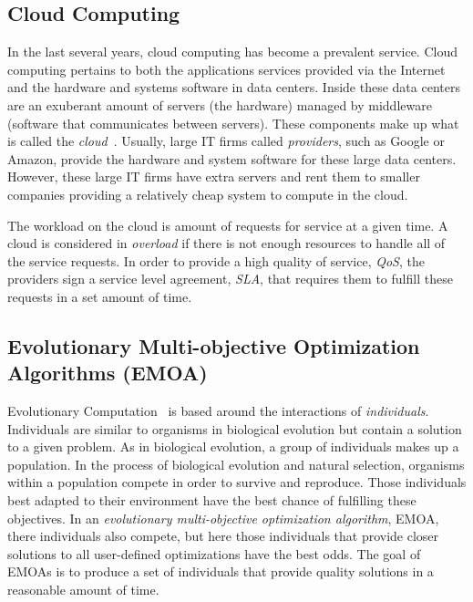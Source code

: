 \documentclass{sig-alternate}
\begin{document}
\subsection{Cloud Computing}
\label{sec:Cloud Computing}

In the last several years, cloud computing has become a prevalent service. Cloud computing pertains to both the applications services provided via the Internet and the hardware and systems software in data centers. Inside these data centers are an exuberant amount of servers (the hardware) managed by middleware (software that communicates between servers). These components make up what is called the \emph{cloud}~\cite{Armbrust}. Usually, large IT firms called \emph{providers}, such as Google or Amazon, provide the hardware and system software for these large data centers. However, these large IT firms have extra servers and rent them to smaller companies providing a relatively cheap system to compute in the cloud. 

The workload on the cloud is amount of requests for service at a given time. A cloud is considered in \emph{overload} if there is not enough resources to handle all of the service requests. In order to provide a high quality of service, \emph{QoS}, the providers sign a service level agreement, \emph{SLA}, that requires them to fulfill these requests in a set amount of time. 

\subsection{Evolutionary Multi-objective Optimization Algorithms (EMOA)}
\label{sec:EMOA}

Evolutionary Computation~\cite{poli08:fieldguide} is based around the interactions of \emph{individuals}. Individuals are similar to organisms in biological evolution but contain a solution to a given problem. As in biological evolution, a group of individuals makes up a population. In the process of biological evolution and natural selection, organisms within a population compete in order to survive and reproduce. Those individuals best adapted to their environment have the best chance of fulfilling these objectives.  In an \emph{evolutionary multi-objective optimization algorithm}, EMOA, there individuals also compete, but here those individuals that provide closer solutions to all user-defined optimizations have the best odds. The goal of EMOAs is to produce a set of individuals that provide quality solutions in a reasonable amount of time. 
\end{document}
